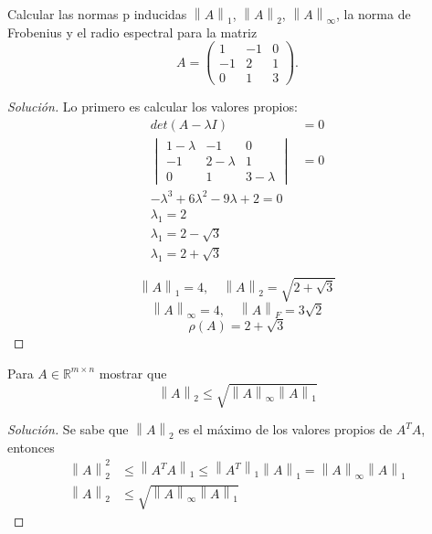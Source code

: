 \documentclass[12pt]{book}
\newcommand{\R}{\mathbb{R}}
\newcommand\norm[1]{\left\lVert#1\right\rVert}
\newenvironment{solucion}
  {\renewcommand\qedsymbol{$\square$}\begin{proof}[Solución]}
  {\end{proof}}
\begin{document}
\eje Calcular las normas p inducidas $\norm{A}_1$, $\norm{A}_2$, $\norm{A}_\infty$, la norma de Frobenius y el radio espectral para la matriz
\[A=\begin{pmatrix}
1&-1&0\\
-1&2&1\\
0&1&3
\end{pmatrix}.\]

\begin{solucion}
Lo primero es calcular los valores propios:
\begin{align*}
    det(A-\lambda I)&=0\\
    \begin{vmatrix}
     1-\lambda  &     -1            &0\\
    -1          &      2-\lambda    &1\\
     0          &      1            &3-\lambda
\end{vmatrix} &=0\\
-\lambda^3+6\lambda^2-9\lambda+2=0\\
\lambda_1=2\\
\lambda_1=2-\sqrt{3}\\
\lambda_1=2+\sqrt{3}
\end{align*}

\[\norm{A}_1=4,\quad \norm{A}_2=\sqrt{2+\sqrt{3}}\]
\[\norm{A}_\infty=4,\quad \norm{A}_F=3\sqrt{2}\]
\[\rho(A)=2+\sqrt{3}\]
\end{solucion}

\eje Para $A\in\R^{m\times n}$ mostrar que
\[ \norm{A}_2\leq\sqrt{\norm{A}_\infty\norm{A}_1}\]
\begin{solucion}
Se sabe que $\norm{A}_2$ es el máximo de los valores propios de $A^TA$, entonces
\begin{align*}
    \norm{A}_2^2&\leq\norm{A^TA}_1\leq\norm{A^T}_1\norm{A}_1=\norm{A}_\infty\norm{A}_1\\
    \norm{A}_2&\leq\sqrt{\norm{A}_\infty\norm{A}_1}
\end{align*}
\end{solucion}
\end{document}

